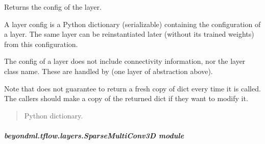 \documentclass[letterpaper,10pt,english]{sphinxmanual}
\begin{document}
\begin{fulllineitems}
\begin{fulllineitems}
\end{fulllineitems}


\begin{fulllineitems}
\label{\detokenize{beyondml.tflow.layers:beyondml.tflow.layers.SparseMultiConv2D.SparseMultiConv2D.get_config}}
\pysigstartsignatures
{}
\pysigstopsignatures
\sphinxAtStartPar
Returns the config of the layer.

\sphinxAtStartPar
A layer config is a Python dictionary (serializable)
containing the configuration of a layer.
The same layer can be reinstantiated later
(without its trained weights) from this configuration.

\sphinxAtStartPar
The config of a layer does not include connectivity
information, nor the layer class name. These are handled
by  (one layer of abstraction above).

\sphinxAtStartPar
Note that  does not guarantee to return a fresh copy of
dict every time it is called. The callers should make a copy of the
returned dict if they want to modify it.
\begin{quote}\begin{description}
\sphinxAtStartPar
Python dictionary.

\end{description}\end{quote}

\end{fulllineitems}


\end{fulllineitems}



\subparagraph{beyondml.tflow.layers.SparseMultiConv3D module}
\label{\detokenize{beyondml.tflow.layers:module-beyondml.tflow.layers.SparseMultiConv3D}}\label{\detokenize{beyondml.tflow.layers:beyondml-tflow-layers-sparsemulticonv3d-module}}
\end{document}
